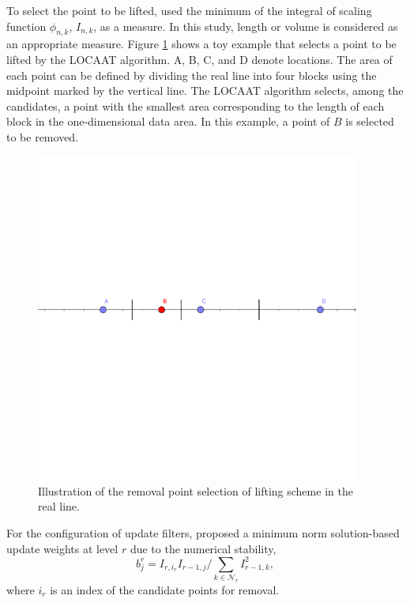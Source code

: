\documentclass[11pt,titlepage]{article}
\begin{document}
To select the point to be lifted, \cite{Jansen2009} used the minimum of the integral of scaling function $\phi_{n,k}$, $I_{n,k}$, as a measure. In this study, length or volume is considered as an appropriate measure. Figure \ref{fig:removeI} shows a toy example that selects a point to be lifted by the LOCAAT algorithm. A, B, C, and D denote locations. The area of each point can be defined by dividing the real line into four blocks using the midpoint marked by the vertical line. The LOCAAT algorithm selects, among the candidates, a point with the smallest area corresponding to the length of each block in the one-dimensional data area. In this example, a point of $B$ is selected to be removed. 
\begin{figure}
	\vspace{-5mm}
	\includegraphics[width=0.95\textwidth]{Stream_result/horzline.pdf}
	\caption{Illustration of the removal point selection of lifting scheme in the real line.}
	\vspace{-3mm}
	\label{fig:removeI}
\end{figure}
For the configuration of update filters, \citet{Jansen2009} proposed a minimum norm solution-based update weights at level $r$ due to the numerical stability, 
\begin{equation}
\label{eqn:updatefilter}
b_{j}^r = I_{r, i_r}I_{r-1,j}/ \sum_{k\in \mathcal{N}_r} I_{r-1,k}^2,
\end{equation}
where $i_r$ is an index of the candidate points for removal. 
\end{document}
